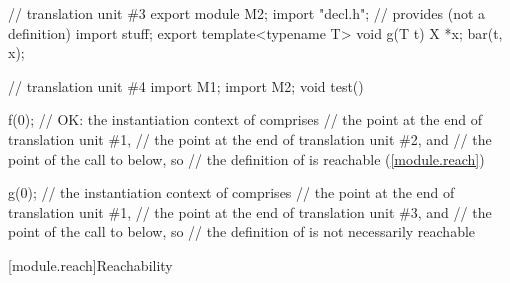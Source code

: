 \begin{std.txt}
\begin{example}
\begin{codeblock}
// translation unit \#3
export module M2;
import "decl.h";        // provides  (not a definition)
import stuff;
export template<typename T> void g(T t) {
 X *x;
 bar(t, x);
}

// translation unit \#4
import M1;
import M2;
void test() {
  f(0); // OK: the instantiation context of  comprises
        // the point at the end of translation unit \#1,
        // the point at the end of translation unit \#2, and
        // the point of the call to  below, so
        // the definition of  is reachable (\ref{module.reach})

  g(0); // the instantiation context of  comprises
        // the point at the end of translation unit \#1,
        // the point at the end of translation unit \#3, and
        // the point of the call to  below, so
        // the definition of  is not necessarily reachable
}
\end{codeblock}
\end{example}
\end{std.txt}

[module.reach]{Reachability}

